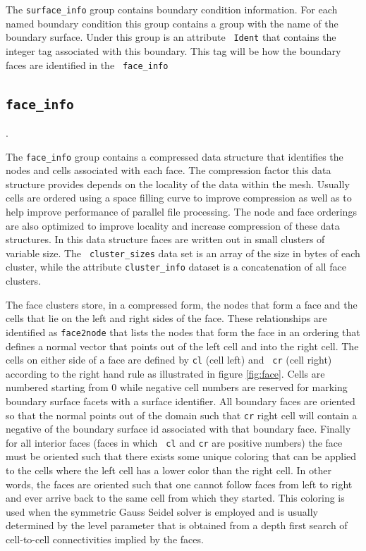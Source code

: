 \documentclass{article}
\begin{document}
The {\tt surface\_info} group contains boundary condition information.
For each named boundary condition this group contains a group with the
name of the boundary surface. Under this group is an attribute {\tt
  Ident} that contains the integer tag associated with this boundary.
This tag will be how the boundary faces are identified in the {\tt
  face\_info}

\subsection{\tt face\_info}.

The {\tt face\_info} group contains a compressed data structure that
identifies the nodes and cells associated with each face.  The
compression factor this data structure provides depends on the
locality of the data within the mesh.  Usually cells are ordered using
a space filling curve to improve compression as well as to help
improve performance of parallel file processing.  The node and face
orderings are also optimized to improve locality and increase
compression of these data structures.  In this data structure faces
are written out in small clusters of variable size.  The {\tt
  cluster\_sizes} data set is an array of the size in bytes of each
cluster, while the attribute {\tt cluster\_info} dataset is a
concatenation of all face clusters.

The face clusters store, in a compressed form, the nodes that form a
face and the cells that lie on the left and right sides of the face.
These relationships are identified as {\tt face2node} that lists the
nodes that form the face in an ordering that defines a normal vector
that points out of the left cell and into the right cell.  The cells
on either side of a face are defined by {\tt cl} (cell left) and {\tt
  cr} (cell right) according to the right hand rule as illustrated in
figure \ref{fig:face}.  Cells are numbered starting from $0$ while
negative cell numbers are reserved for marking boundary surface facets
with a surface identifier.  All boundary faces are oriented so that
the normal points out of the domain such that {\tt cr} right cell will
contain a negative of the boundary surface id associated with that
boundary face.  Finally for all interior faces (faces in which {\tt
  cl} and {\tt cr} are positive numbers) the face must be oriented
such that there exists some unique coloring that can be applied to the
cells where the left cell has a lower color than the right cell.  In
other words, the faces are oriented such that one cannot follow faces
from left to right and ever arrive back to the same cell from which
they started.  This coloring is used when the symmetric Gauss Seidel
solver is employed and is usually determined by the level parameter
that is obtained from a depth first search of cell-to-cell
connectivities implied by the faces.
\end{document}
